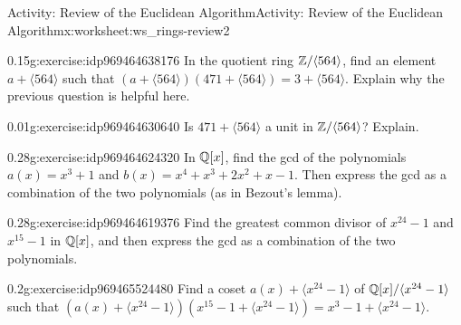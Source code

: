 \documentclass[11pt]{book}
\begin{document}
\begin{worksheet-subsection}{Activity: Review of the Euclidean Algorithm}{}{Activity: Review of the Euclidean Algorithm}{}{}{x:worksheet:ws_rings-review2}
\begin{divisionexercise}{2}{}{0.15}{g:exercise:idp969464638176}
In the quotient ring \(\mathbb{Z}/\langle 564 \rangle\), find an element \(a + \langle 564\rangle\) such that \((a+\langle 564\rangle)(471 + \langle 564\rangle) = 3 + \langle 564 \rangle\).  Explain why the previous question is helpful here.%
\end{divisionexercise}%
\begin{divisionexercise}{3}{}{0.01}{g:exercise:idp969464630640}%
Is \(471 + \langle 564\rangle\) a unit in \(\mathbb{Z}/\langle 564\rangle\)?  Explain.%
\end{divisionexercise}%
\clearpage
\begin{divisionexercise}{4}{}{0.28}{g:exercise:idp969464624320}%
In \(\mathbb{Q}[x]\), find the gcd of the polynomials \(a(x) = x^3 + 1\) and \(b(x) = x^4 + x^3 + 2x^2 + x - 1\).  Then express the gcd as a combination of the two polynomials (as in Bezout's lemma).%
\end{divisionexercise}%
\begin{divisionexercise}{5}{}{0.28}{g:exercise:idp969464619376}%
Find the greatest common divisor of \(x^{24}-1\) and \(x^{15}-1\) in \(\mathbb{Q}[x]\), and then express the gcd as a combination of the two polynomials.%
\end{divisionexercise}%
\begin{divisionexercise}{6}{}{0.2}{g:exercise:idp969465524480}%
Find a coset \(a(x) + \langle x^{24}-1\rangle\) of \(\mathbb{Q}[x]/\langle x^{24}-1\rangle\) such that \((a(x) + \langle x^{24}-1\rangle)(x^{15}-1 + \langle x^{24}-1\rangle) = x^3-1 + \langle x^{24}-1\rangle\).%
\end{divisionexercise}%
\end{worksheet-subsection}
\restoregeometry
\end{document}
